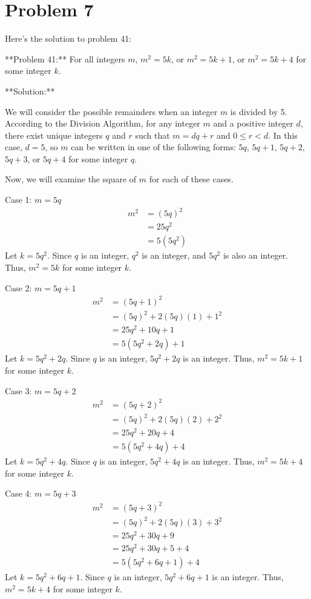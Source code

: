\documentclass{article}
\begin{document}
\newpage

\section*{Problem 7}
Here's the solution to problem 41:

**Problem 41:** For all integers $m$, $m^2 = 5k$, or $m^2 = 5k+1$, or $m^2 = 5k+4$ for some integer $k$.

**Solution:**

We will consider the possible remainders when an integer $m$ is divided by 5. According to the Division Algorithm, for any integer $m$ and a positive integer $d$, there exist unique integers $q$ and $r$ such that $m = dq + r$ and $0 \le r < d$. In this case, $d=5$, so $m$ can be written in one of the following forms: $5q$, $5q+1$, $5q+2$, $5q+3$, or $5q+4$ for some integer $q$.

Now, we will examine the square of $m$ for each of these cases.

Case 1: $m = 5q$
\begin{align*} m^2 &= (5q)^2 \\ &= 25q^2 \\ &= 5(5q^2) \end{align*}
Let $k = 5q^2$. Since $q$ is an integer, $q^2$ is an integer, and $5q^2$ is also an integer. Thus, $m^2 = 5k$ for some integer $k$.

Case 2: $m = 5q+1$
\begin{align*} m^2 &= (5q+1)^2 \\ &= (5q)^2 + 2(5q)(1) + 1^2 \\ &= 25q^2 + 10q + 1 \\ &= 5(5q^2 + 2q) + 1 \end{align*}
Let $k = 5q^2 + 2q$. Since $q$ is an integer, $5q^2 + 2q$ is an integer. Thus, $m^2 = 5k+1$ for some integer $k$.

Case 3: $m = 5q+2$
\begin{align*} m^2 &= (5q+2)^2 \\ &= (5q)^2 + 2(5q)(2) + 2^2 \\ &= 25q^2 + 20q + 4 \\ &= 5(5q^2 + 4q) + 4 \end{align*}
Let $k = 5q^2 + 4q$. Since $q$ is an integer, $5q^2 + 4q$ is an integer. Thus, $m^2 = 5k+4$ for some integer $k$.

Case 4: $m = 5q+3$
\begin{align*} m^2 &= (5q+3)^2 \\ &= (5q)^2 + 2(5q)(3) + 3^2 \\ &= 25q^2 + 30q + 9 \\ &= 25q^2 + 30q + 5 + 4 \\ &= 5(5q^2 + 6q + 1) + 4 \end{align*}
Let $k = 5q^2 + 6q + 1$. Since $q$ is an integer, $5q^2 + 6q + 1$ is an integer. Thus, $m^2 = 5k+4$ for some integer $k$.
\end{document}

